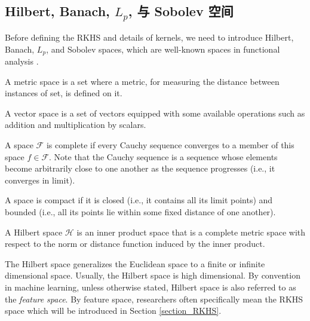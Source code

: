 \documentclass[lang=cn,10pt]{gorgeousnbook}
\numberwithin{equation}{section}%
\numberwithin{figure}{section}%
\begin{document}
\subsection{Hilbert, Banach, $L_p$, 与 Sobolev 空间}\label{section_spaces}

Before defining the RKHS and details of kernels, we need to introduce Hilbert, Banach, $L_p$, and Sobolev spaces, which are well-known spaces in functional analysis \cite{conway2007course}. 

\begin{definition}
A metric space is a set where a metric, for measuring the distance between instances of set, is defined on it. 
\end{definition}

\begin{definition}
A vector space is a set of vectors equipped with some available operations such as addition and multiplication by scalars. 
\end{definition}

\begin{definition}
A space $\mathcal{F}$ is complete if every Cauchy sequence converges to a member of this space $f \in \mathcal{F}$. Note that the Cauchy sequence is a sequence whose elements become arbitrarily close to one another as the sequence progresses (i.e., it converges in limit). 
\end{definition}

\begin{definition}\label{definition_compact_space}
A space is compact if it is closed (i.e., it contains all its limit points) and bounded (i.e., all its points lie within some fixed distance of one another). 
\end{definition}


\begin{definition} \label{definition_Hilbert_space}
A Hilbert space $\mathcal{H}$ is an inner product space that is a complete metric space with respect to the norm or distance function induced by the inner product. 
\end{definition}
The Hilbert space generalizes the Euclidean space to a finite or infinite dimensional space. Usually, the Hilbert space is high dimensional. By convention in machine learning, unless otherwise stated, Hilbert space is also referred to as the \textit{feature space}. By feature space, researchers often specifically mean the RKHS space which will be introduced in Section \ref{section_RKHS}.
\end{document}
